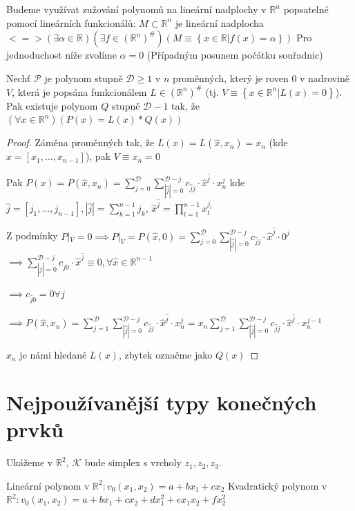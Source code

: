 \documentclass[../main.tex]{subfiles}
\begin{document}
\begin{remark}
    Budeme využívat zužování polynomů na lineární nadplochy v $\mathbb{R}^n$ popsatelné pomocí lineárních funkcionálů: \break
    $M \subset \mathbb{R}^n$ je lineární nadplocha $<=> (\exists \alpha\in \mathbb{R})(\exists f \in (\mathbb{R}^n)^\#)(M\equiv \left\{ x\in\mathbb{R} | f(x) = \alpha    \right\})$ \break
    Pro jednoduchost níže zvolíme $\alpha = 0$ (Případným posunem počátku souřadnic)
\end{remark}

\begin{lemma}[O redukci]
    Nechť $\mathcal{P}$ je polynom stupně $\mathcal{D} \geq 1$ v $n$ proměnných, který je roven $0$ v nadrovině $V$, která je popsána funkcionálem $L\in(\mathbb{R}^n)^\#$ (tj. $V\equiv \left\{x\in\mathbb{R}^n| L(x)= 0\right\}$).
    Pak existuje polynom $Q$ stupně $\mathcal{D} - 1$ tak, že $(\forall x\in\mathbb{R}^n)(P(x) = L(x)*Q(x))$    
\end{lemma}

\begin{proof}
    Záměna proměnných tak, že $L(x) = L(\hat{x}, x_n) = x_n$ (kde $\hat{x} = [x_1,...,x_{n-1}]$), pak $V\equiv x_n = 0$

    Pak $P(x) = P(\hat{x},x_n) = \sum_{j=0}^\mathcal{D} \sum_{|\hat{j}| = 0}^{\mathcal{D}-j} c_{\hat{j}j}\cdot\hat{x}^{\hat{j}}\cdot x_n^j$ 
    kde $\hat{j}=\left[j_1,...,j_{n-1}\right], |\hat{j}| = \sum_{k=1}^{n-1}j_k$, $\hat{x}^{\hat{j}} = \prod_{l=1}^{n-1}x_l^{j_l}$

    Z podmínky $P|_V = 0 \implies P|_V = P(\hat{x},0) = \sum_{j=0}^\mathcal{D} \sum_{|\hat{j}| = 0}^{\mathcal{D}-j} c_{\hat{j}j}\cdot\hat{x}^{\hat{j}}\cdot 0^j$    $\implies\sum_{|\hat{j}| = 0}^{\mathcal{D}-j} c_{\hat{j}0}\cdot\hat{x}^{\hat{j}}\equiv0, \forall\hat{x}\in\mathbb{R}^{n-1}$

    $\implies c_{\hat{j}0} = 0 \forall j$

    $\implies P(\hat{x},x_n) = \sum_{j=1}^\mathcal{D} \sum_{|\hat{j}| = 0}^{\mathcal{D}-j} c_{\hat{j}j}\cdot\hat{x}^{\hat{j}}\cdot x_n^j = x_n \sum_{j=1}^\mathcal{D} \sum_{|\hat{j}| = 0}^{\mathcal{D}-j} c_{\hat{j}j}\cdot\hat{x}^{\hat{j}}\cdot x_n^{j-1}$

    $x_n$ je námi hledané $L(x)$, zbytek označme jako $Q(x)$
\end{proof}

\section{Nejpoužívanější typy konečných prvků}
\begin{remark}
    Ukážeme v $\mathbb{R}^2$, $\mathcal{K}$ bude simplex s vrcholy $z_1, z_2, z_3$.

    Lineární polynom v $\mathbb{R}^2 : v_0(x_1,x_2) = a + bx_1 + cx_2 $ 
    Kvadratický polynom v $\mathbb{R}^2 : v_0(x_1,x_2) = a + bx_1 + cx_2 + dx_1^2 + ex_1x_2 + fx_2^2 $
\end{remark}
\end{document}
